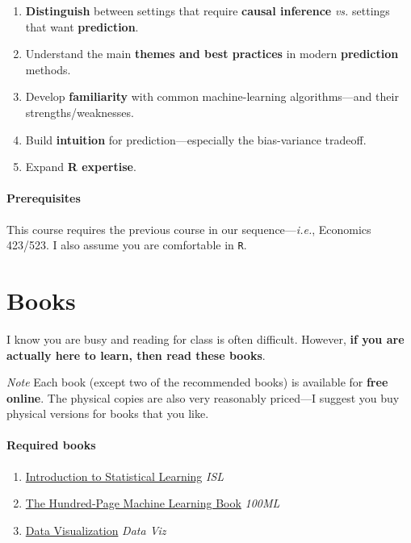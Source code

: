 \documentclass[10pt]{article}
\newcommand{\emf}[1]{\textbf{\textcolor{grass_green}{#1}}}
\begin{document}
\begin{enumerate}
  \item \emf{Distinguish} between settings that require \emf{causal inference} \textit{vs.} settings that want \emf{prediction}.
  \item Understand the main \emf{themes and best practices} in modern \emf{prediction} methods.
  \item Develop \emf{familiarity} with common machine-learning algorithms---and their strengths/weaknesses.
  \item Build \emf{intuition} for prediction---especially the bias-variance tradeoff.
  \item Expand \emf{R expertise}.
\end{enumerate}

\paragraph{Prerequisites} This course requires the previous course in our sequence---\textit{i.e.}, Economics 423/523. I also assume you are comfortable in \texttt{R}.

\section*{Books} I know you are busy and reading for class is often difficult. However, \emf{if you are actually here to learn, then read these books}.

\bigskip

\noindent\textit{Note} Each book (except two of the recommended books) is available for \emf{free online}. The physical copies are also very reasonably priced---I suggest you buy physical versions for books that you like.

\paragraph{Required books}

\begin{enumerate}
\item \href{https://www-bcf.usc.edu/~gareth/ISL/}{Introduction to Statistical Learning} \textit{ISL}
\item \href{http://themlbook.com/}{The Hundred-Page Machine Learning Book} \textit{100ML}
\item \href{https://socviz.co/}{Data Visualization} \textit{Data Viz}
\end{enumerate}
\end{document}
